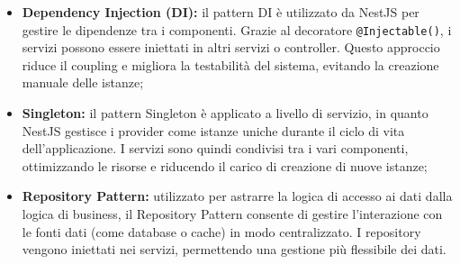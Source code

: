 \begin{itemize}
  \item \textbf{Dependency Injection (DI):} il pattern DI è utilizzato da NestJS per gestire le dipendenze tra i componenti. Grazie al decoratore \texttt{@Injectable()}, i servizi possono essere iniettati in altri servizi o controller. Questo approccio riduce il coupling e migliora la testabilità del sistema, evitando la creazione manuale delle istanze;
  
  \item \textbf{Singleton:} il pattern Singleton è applicato a livello di servizio, in quanto NestJS gestisce i provider come istanze uniche durante il ciclo di vita dell'applicazione. I servizi sono quindi condivisi tra i vari componenti, ottimizzando le risorse e riducendo il carico di creazione di nuove istanze;

  \item \textbf{Repository Pattern:} utilizzato per astrarre la logica di accesso ai dati dalla logica di business, il Repository Pattern consente di gestire l'interazione con le fonti dati (come database o cache) in modo centralizzato. I repository vengono iniettati nei servizi, permettendo una gestione più flessibile dei dati.
\end{itemize}

